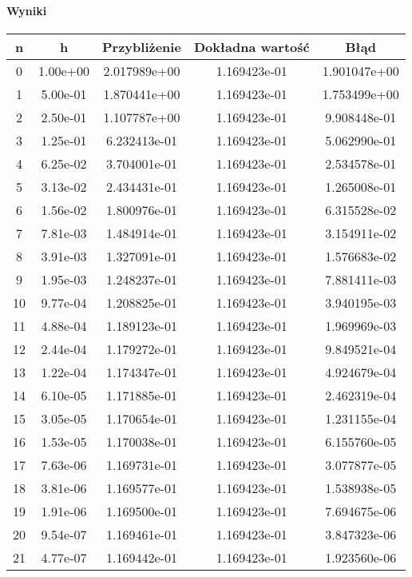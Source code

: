 \documentclass[a4paper,12pt]{article}
\begin{document}
\paragraph{Wyniki}
\begin{center}
\tiny
\begin{tabular}{c c c c c}
\hline
n & h & Przybliżenie & Dokładna wartość & Błąd \\
\hline
 0 & 1.00e+00 & 2.017989e+00 & 1.169423e-01 & 1.901047e+00 \\
 1 & 5.00e-01 & 1.870441e+00 & 1.169423e-01 & 1.753499e+00 \\
 2 & 2.50e-01 & 1.107787e+00 & 1.169423e-01 & 9.908448e-01 \\
 3 & 1.25e-01 & 6.232413e-01 & 1.169423e-01 & 5.062990e-01 \\
 4 & 6.25e-02 & 3.704001e-01 & 1.169423e-01 & 2.534578e-01 \\
 5 & 3.13e-02 & 2.434431e-01 & 1.169423e-01 & 1.265008e-01 \\
 6 & 1.56e-02 & 1.800976e-01 & 1.169423e-01 & 6.315528e-02 \\
 7 & 7.81e-03 & 1.484914e-01 & 1.169423e-01 & 3.154911e-02 \\
 8 & 3.91e-03 & 1.327091e-01 & 1.169423e-01 & 1.576683e-02 \\
 9 & 1.95e-03 & 1.248237e-01 & 1.169423e-01 & 7.881411e-03 \\
10 & 9.77e-04 & 1.208825e-01 & 1.169423e-01 & 3.940195e-03 \\
11 & 4.88e-04 & 1.189123e-01 & 1.169423e-01 & 1.969969e-03 \\
12 & 2.44e-04 & 1.179272e-01 & 1.169423e-01 & 9.849521e-04 \\
13 & 1.22e-04 & 1.174347e-01 & 1.169423e-01 & 4.924679e-04 \\
14 & 6.10e-05 & 1.171885e-01 & 1.169423e-01 & 2.462319e-04 \\
15 & 3.05e-05 & 1.170654e-01 & 1.169423e-01 & 1.231155e-04 \\
16 & 1.53e-05 & 1.170038e-01 & 1.169423e-01 & 6.155760e-05 \\
17 & 7.63e-06 & 1.169731e-01 & 1.169423e-01 & 3.077877e-05 \\
18 & 3.81e-06 & 1.169577e-01 & 1.169423e-01 & 1.538938e-05 \\
19 & 1.91e-06 & 1.169500e-01 & 1.169423e-01 & 7.694675e-06 \\
20 & 9.54e-07 & 1.169461e-01 & 1.169423e-01 & 3.847323e-06 \\
21 & 4.77e-07 & 1.169442e-01 & 1.169423e-01 & 1.923560e-06 \\

\end{tabular}
\end{center}
\end{document}
